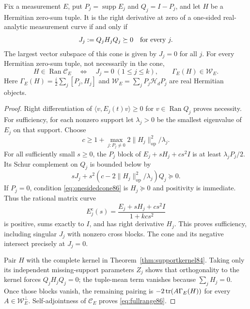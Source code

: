 \begin{lemma}\label{lem:onesidedcone86}
Fix a measurement $E$, put $P_j=\operatorname{supp}E_j$ and $Q_j=I-P_j$,
and let $H$ be a Hermitian zero-sum tuple.  It is the right derivative
at zero of a one-sided real-analytic measurement curve if and only if
\begin{equation}\label{eq:onesidedcone86}
 J_j:=Q_jH_jQ_j\succeq0\quad\hbox{for every }j.
\end{equation}
The largest vector subspace of this cone is given by $J_j=0$ for all
$j$.  For every Hermitian zero-sum tuple, not necessarily in the cone,
\begin{equation}\label{eq:fullrange86}
 H\in\operatorname{Ran}\mathcal C_E
 \quad\Longleftrightarrow\quad
 J_j=0\ (1\le j\le k),\qquad
 \Gamma_E(H)\in\mathcal W_E.
\end{equation}
Here $\Gamma_E(H)=\frac i2\sum_j[P_j,H_j]$ and
$\mathcal W_E=\sum_jP_j\mathcal H_dP_j$ are real Hermitian objects.
\end{lemma}
\begin{proof}
Right differentiation of $\langle v,E_j(t)v\rangle\ge0$ for
$v\in\operatorname{Ran}Q_j$ proves necessity.  For sufficiency, for
each nonzero support let $\lambda_j>0$ be the smallest eigenvalue
of $E_j$ on that support.  Choose
\[
 c\ge1+\max_{j:P_j\ne0}2\|H_j\|_{\mathrm{op}}^2/\lambda_j.
\]
For all sufficiently small $s\ge0$, the $P_j$ block of
$E_j+sH_j+cs^2I$ is at least $\lambda_jP_j/2$.
Its Schur complement on $Q_j$ is bounded below by
\[
 sJ_j+s^2\left(c-2\|H_j\|_{\mathrm{op}}^2/\lambda_j\right)Q_j
 \succeq0.
\]
If $P_j=0$, condition \eqref{eq:onesidedcone86} is $H_j\succeq0$
and positivity is immediate.  Thus the rational matrix curve
\begin{equation}\label{eq:conecurve86}
 E_j^{\mathrm c}(s)=\frac{E_j+sH_j+cs^2I}{1+kcs^2}
\end{equation}
is positive, sums exactly to $I$, and has right derivative $H_j$.
This proves sufficiency, including singular $J_j$ with nonzero cross
blocks.  The cone and its negative intersect precisely at $J_j=0$.

Pair $H$ with the complete kernel in
Theorem~\ref{thm:supportkernel84}.  Taking only its independent
missing-support parameters $Z_j$ shows that orthogonality to the
kernel forces $Q_jH_jQ_j=0$; the tuple-mean term vanishes because
$\sum_jH_j=0$.  Once those blocks vanish, the remaining pairing is
$-2\operatorname{tr}(A\Gamma_E(H))$ for every $A\in\mathcal W_E^\perp$.
Self-adjointness of $\mathcal C_E$ proves \eqref{eq:fullrange86}.
\end{proof}

